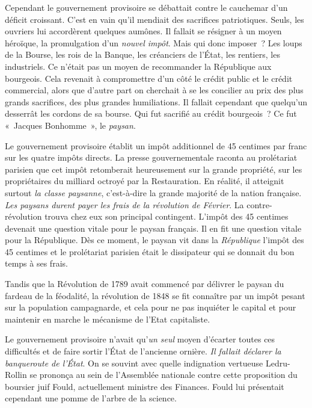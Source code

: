\documentclass[french,twoside]{book} %
\begin{document}
Cependant le gouvernement provisoire se débattait contre le cauchemar d’un déficit croissant. C’est en vain qu’il mendiait des sacrifices patriotiques. Seuls, les ouvriers lui accordèrent quelques aumônes. Il fallait se résigner à un moyen héroïque, la promulgation d’un \emph{nouvel impôt}. Mais qui donc imposer ? Les loups de la Bourse, les rois de la Banque, les créanciers de l’État, les rentiers, les industriels. Ce n’était pas un moyen de recommander la République aux bourgeois. Cela revenait à compromettre d’un côté le crédit public et le crédit commercial, alors que d’autre part on cherchait à se les concilier au prix des plus grands sacrifices, des plus grandes humiliations. Il fallait cependant que quelqu’un desserrât les cordons de sa bourse. Qui fut sacrifié au crédit bourgeois ? Ce fut « Jacques Bonhomme », le \emph{paysan}.\par
Le gouvernement provisoire établit un impôt additionnel de 45 centimes par franc sur les quatre impôts directs. La presse gouvernementale raconta au prolétariat parisien que cet impôt retomberait heureusement sur la grande propriété, sur les propriétaires du milliard octroyé par la Restauration. En réalité, il atteignit surtout \emph{la classe paysanne}, c’est-à-dire la grande majorité de la nation française. \emph{Les paysans durent payer les frais de la révolution de Février}. La contre-révolution trouva chez eux son principal contingent. L’impôt des 45 centimes devenait une question vitale pour le paysan français. Il en fit une question vitale pour la République. Dès ce moment, le paysan vit dans la \emph{République} l’impôt des 45 centimes et le prolétariat parisien était le dissipateur qui se donnait du bon temps à ses frais.\par
Tandis que la Révolution de 1789 avait commencé par délivrer le paysan du fardeau de la féodalité, la révolution de 1848 se fit connaître par un impôt pesant sur la population campagnarde, et cela pour ne pas inquiéter le capital et pour maintenir en marche le mécanisme de l’Etat capitaliste.\par
Le gouvernement provisoire n’avait qu’\emph{un seul} moyen d’écarter toutes ces difficultés et de faire sortir l’État de l’ancienne ornière. \emph{Il fallait déclarer la banqueroute de l’État}. On se souvint avec quelle indignation vertueuse Ledru-Rollin se prononça au sein de l’Assemblée nationale contre cette proposition du boursier juif Fould, actuellement ministre des Finances. Fould lui présentait cependant une pomme de l’arbre de la science.\par
\end{document}
